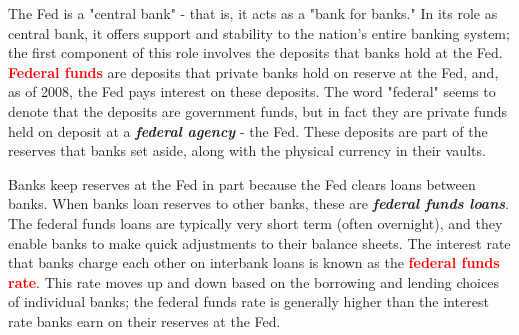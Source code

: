 \documentclass[11pt]{article} %
\begin{document}
The Fed is a "central bank" - that is, it acts as a "bank for banks." In its role as central bank, it offers support and stability to the nation's entire banking system; the first component of this role involves the deposits that banks hold at the Fed. \textbf{\textcolor{red}{Federal funds}} are deposits that private banks hold on reserve at the Fed, and, as of 2008, the Fed pays interest on these deposits. The word "federal" seems to denote that the deposits are government funds, but in fact they are private funds held on deposit at a \textit{\textbf{federal agency}} - the Fed. These deposits are part of the reserves that banks set aside, along with the physical currency in their vaults.

Banks keep reserves at the Fed in part because the Fed clears loans between banks. When banks loan reserves to other banks, these are \textit{\textbf{federal funds loans}}. The federal funds loans are typically very short term (often overnight), and they enable banks to make quick adjustments to their balance sheets. The interest rate that banks charge each other on interbank loans is known as the \textbf{\textcolor{red}{federal funds rate}}. This rate moves up and down based on the borrowing and lending choices of individual banks; the federal funds rate is generally higher than the interest rate banks earn on their reserves at the Fed.
\end{document}
